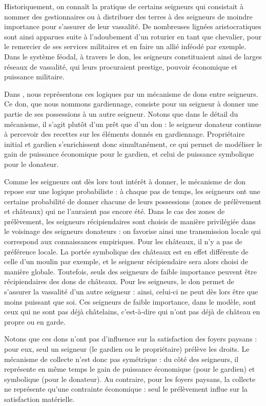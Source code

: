 Historiquement, on connaît la pratique de certains seigneurs qui consistait à nommer des gestionnaires ou à distribuer des terres à des seigneurs de moindre importance pour s'assurer de leur vassalité.
De nombreuses lignées aristocratiques sont ainsi apparues suite à l'adoubement d'un roturier en tant que chevalier, pour le remercier de ses services militaires et en faire un allié inféodé par exemple.
Dans le système féodal, à travers le don, les seigneurs constituaient ainsi de larges réseaux de vassalité, qui leurs procuraient prestige, pouvoir économique et puissance militaire.

\begin{tcolorbox}[breakable,left=0pt,right=0pt,top=0pt,bottom=0pt,
	colback=gray!15,colframe=gray!15,width=\dimexpr\textwidth\relax, 
	enlarge left by=0mm, boxsep=5pt,arc=0pt,outer arc=0pt]
	
	Dans \simfeodal{}, nous représentons ces logiques par un mécanisme de dons entre seigneurs.
	Ce don, que nous nommons \og gardiennage\fg{}, consiste pour un seigneur à donner une partie de ses possessions à un autre seigneur.
	Notons que dans le détail du mécanisme, il s'agit plutôt d'un prêt que d'un don : le seigneur donateur continue à percevoir des recettes sur les éléments donnés en gardiennage\footnotemark.
	Propriétaire initial et gardien s'enrichissent donc simultanément, ce qui permet de modéliser le gain de puissance économique pour le gardien, et celui de puissance symbolique pour le donateur.
	
	\medskip
	Comme les seigneurs ont dès lors tout intérêt à donner, le mécanisme de don repose sur une logique probabiliste : à chaque pas de temps, les seigneurs ont une certaine probabilité de donner chacune de leurs possessions (zones de prélèvement et châteaux) qui ne l'auraient pas encore été.
	Dans le cas des zones de prélèvement, les seigneurs récipiendaires sont choisis de manière privilégiée dans le voisinage des seigneurs donateurs : on favorise ainsi une transmission locale qui correspond aux connaissances empiriques.
	Pour les châteaux, il n'y a pas de préférence locale.
	La portée symbolique des châteaux est en effet différente de celle d'un moulin par exemple, et le seigneur récipiendaire sera alors choisi de manière globale.
	Toutefois, seuls des seigneurs de faible importance peuvent être récipiendaires des dons de châteaux.
	Pour les seigneurs, le don permet de s'assurer la vassalité d'un autre seigneur : ainsi, celui-ci ne peut dès lors être que moins puissant que soi.
	Ces seigneurs de faible importance, dans le modèle, sont ceux qui ne sont pas déjà châtelains, c'est-à-dire qui n'ont pas déjà de château en propre ou en garde.
	
	\medskip
	Notons que ces dons n'ont pas d'influence sur la satisfaction des foyers paysans : pour eux, seul un seigneur (le gardien ou le propriétaire) prélève les droits.
	Le mécanisme de collecte n'est donc pas symétrique : du côté des seigneurs, il représente en même temps le gain de puissance économique (pour le gardien) et symbolique (pour le donateur).
	Au contraire, pour les foyers paysans, la collecte ne représente qu'une contrainte économique : seul le prélèvement influe sur la satisfaction matérielle.
\end{tcolorbox}
